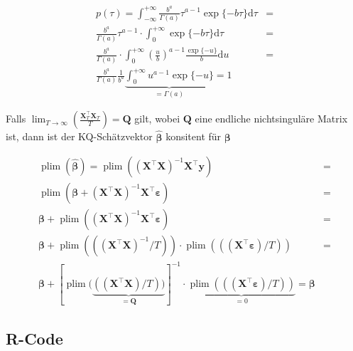 \documentclass[12pt, a4paper, oneside]{article}
\begin{document}
\begin{eqnarray*}p(\tau) = \int_{-\infty}^{+\infty}\frac{b^a}{\Gamma(a)}\tau^{a-1}\operatorname{exp}\{-b\tau\}\mathrm d\tau &= \\ \frac{b^a}{\Gamma(a)}\tau^{a-1} \cdot \int_{0}^{+\infty}\operatorname{exp}\{-b\tau\}\mathrm d\tau &= \\ \frac{b^a}{\Gamma(a)} \cdot \int_{0}^{+\infty}\left(\frac{u}{b}\right)^{a-1}\frac{\operatorname{exp}\{-u\}}{b}\mathrm{d} u &= \\ \frac{b^a}{\Gamma(a)} \frac{1}{b^a} \underbrace{\int_{0}^{+\infty} u^{a-1}\operatorname{exp}\{-u\}}_{=\Gamma(a)}=1
\end{eqnarray*}

Falls $\lim_{T \to \infty}\left(\frac{\mathbf{X}_T^{\top} \mathbf{X}_T}{T}\right)=\mathbf{Q}$ gilt, wobei $\mathbf{Q}$ eine endliche nichtsinguläre Matrix ist, dann ist der KQ-Schätzvektor $\hat {\boldsymbol \beta}$ konsitent für $\boldsymbol \beta$\cite[S. 267]{judge1982introduction}

%
\begin{eqnarray*}\operatorname{plim}(\hat {\boldsymbol \beta} ) = \operatorname{plim}\left( \left(\mathbf{X}^\top \mathbf X \right)^{-1}\mathbf {X}^\top \mathbf y\right) &=\\ \operatorname{plim}\left( \boldsymbol \beta+\left(\mathbf{X}^\top \mathbf X \right)^{-1}\mathbf {X}^\top \boldsymbol \varepsilon \right)
&=\\ \boldsymbol\beta+\operatorname{plim}\left(\left(\mathbf{X}^\top \mathbf X \right)^{-1}\mathbf {X}^\top \boldsymbol \varepsilon \right)
&=\\ \boldsymbol \beta+\operatorname{plim}\left(\left(\left(\mathbf{X}^\top \mathbf X \right)^{-1}/T \right)\right) \cdot \operatorname{plim}\left(\left(\left(\mathbf{X}^\top \boldsymbol \varepsilon \right)/T \right)\right)
&=\\ \boldsymbol \beta+[\operatorname{plim}( \underbrace{((\mathbf{X}^\top \mathbf{X} )/T) )}_{=\mathbf{Q}} ]^{-1} \cdot \underbrace{\operatorname{plim}\left(\left(\left(\mathbf{X}^\top \boldsymbol \varepsilon \right)/T\right)\right)}_{=0}= \boldsymbol \beta
\end{eqnarray*}
%
\newpage
\subsection{R-Code}
\end{document}
